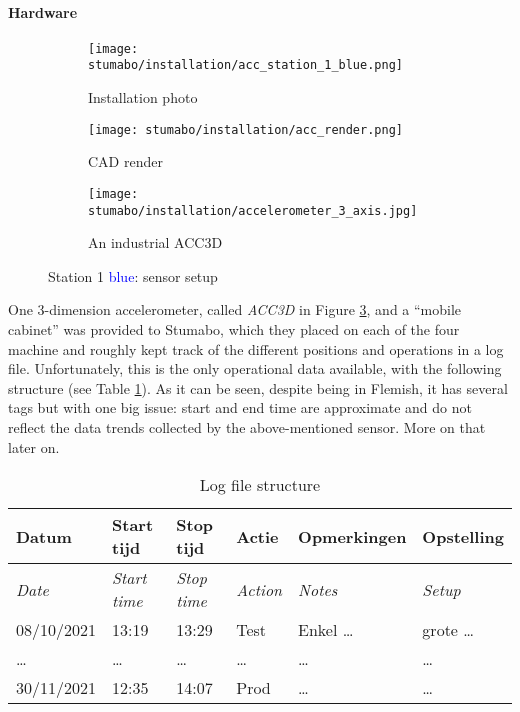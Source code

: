 \paragraph{Hardware} 
\begin{figure}[ht]
    \begin{subfigure}{0.33\textwidth}
        \centering
        \texttt{[image: stumabo/installation/acc\_station\_1\_blue.png]}
        \caption{Installation photo}
        \label{fig:s1b_foto}
    \end{subfigure}
    \begin{subfigure}{0.33\textwidth}
        \centering
        \texttt{[image: stumabo/installation/acc\_render.png]}
        \caption{CAD render}
        \label{fig:s1b_render}
    \end{subfigure}
    \begin{subfigure}{0.32\textwidth}
        \centering
        \texttt{[image: stumabo/installation/accelerometer\_3\_axis.jpg]}
        \caption{An industrial ACC3D}
        \label{fig:stumabo_acc3d}
    \end{subfigure}
    \caption{Station 1 \textcolor{blue}{blue}: sensor setup}
    \label{fig:stu_station1_b}
\end{figure}
One 3-dimension accelerometer, called \textit{ACC3D} in Figure \ref{fig:stumabo_acc3d}, and a ``mobile cabinet'' was provided to Stumabo, 
which they placed on each of the four machine and roughly kept track of the different positions and operations in a log file.
Unfortunately, this is the only operational data available, with the following structure (see Table \ref{tab:stu_logfile}).
As it can be  seen, despite being in Flemish, it has several tags but with one big issue: start and end time are approximate and do not reflect the data trends collected by the above-mentioned sensor.
More on that later on. 

\begin{table}[h]
    \centering
    \begin{tabularx}{\textwidth}{llllll}
        \toprule
        Datum & Start tijd & Stop tijd & Actie & Opmerkingen & Opstelling \\\midrule
        \textit{Date} & \textit{Start time} & \textit{Stop time} & \textit{Action} & \textit{Notes} & \textit{Setup} \\\midrule
        08/10/2021 & 13:19 & 13:29 & Test & Enkel \dots & grote \dots \\ %
        \midrule
        \dots & \dots & \dots & \dots & \dots & \dots \\\midrule
        30/11/2021 & 12:35 & 14:07 & Prod & \dots & \dots \\\bottomrule
    \end{tabularx}
    \caption{Log file structure}
    \label{tab:stu_logfile}
\end{table}

